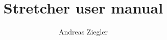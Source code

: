 \documentclass[a4paper]{memoir}
\title{Stretcher user manual}
\author{Andreas Ziegler}
\begin{document}
\begin{titlingpage}
\maketitle
\end{titlingpage}

\tableofcontents
\newpage










\end{document}
